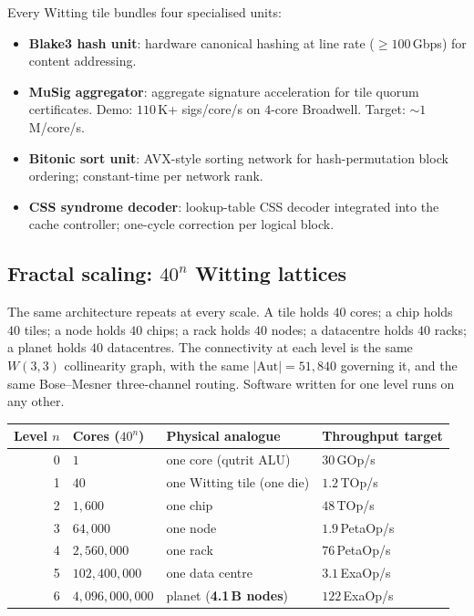 \documentclass[11pt,letterpaper]{article}
\theoremstyle{remark}
\newcommand{\W}{W(3,3)}
\newcommand{\Aut}{\mathrm{Aut}}
\begin{document}
Every Witting tile bundles four specialised units:
\begin{itemize}[leftmargin=2em,nosep]
\item \textbf{Blake3 hash unit}: hardware canonical hashing at line rate
($\geq 100$\,Gbps) for content addressing.
\item \textbf{MuSig aggregator}: aggregate signature acceleration for tile quorum
certificates. Demo: $110$\,K+ sigs/core/s on $4$-core Broadwell. Target:
$\sim 1$\,M/core/s.
\item \textbf{Bitonic sort unit}: AVX-style sorting network for hash-permutation block
ordering; constant-time per network rank.
\item \textbf{CSS syndrome decoder}: lookup-table CSS decoder integrated into the cache
controller; one-cycle correction per logical block.
\end{itemize}

\subsection{\texorpdfstring{Fractal scaling: $40^n$ Witting lattices}{Fractal scaling: 40n Witting lattices}}

The same architecture repeats at every scale. A tile holds $40$ cores; a chip holds $40$
tiles; a node holds $40$ chips; a rack holds $40$ nodes; a datacentre holds $40$ racks; a
planet holds $40$ datacentres. The connectivity at each level is the same $\W$
collinearity graph, with the same $|\Aut| = 51{,}840$ governing it, and the same
Bose--Mesner three-channel routing. Software written for one level runs on any other.

\begin{center}
\renewcommand{\arraystretch}{1.18}
\begin{tabular}{rlll}
\toprule
\textbf{Level $n$} & \textbf{Cores ($40^n$)} & \textbf{Physical analogue} & \textbf{Throughput target} \\
\midrule
0 & $1$           & one core (qutrit ALU)           & $30$\,GOp/s \\
1 & $40$          & one Witting tile (one die)      & $1.2$\,TOp/s \\
2 & $1{,}600$       & one chip                        & $48$\,TOp/s \\
3 & $64{,}000$      & one node                        & $1.9$\,PetaOp/s \\
4 & $2{,}560{,}000$  & one rack                        & $76$\,PetaOp/s \\
5 & $102{,}400{,}000$ & one data centre                & $3.1$\,ExaOp/s \\
6 & $4{,}096{,}000{,}000$ & planet (\textbf{4.1\,B nodes}) & $122$\,ExaOp/s \\
\bottomrule
\end{tabular}
\end{center}
\end{document}
